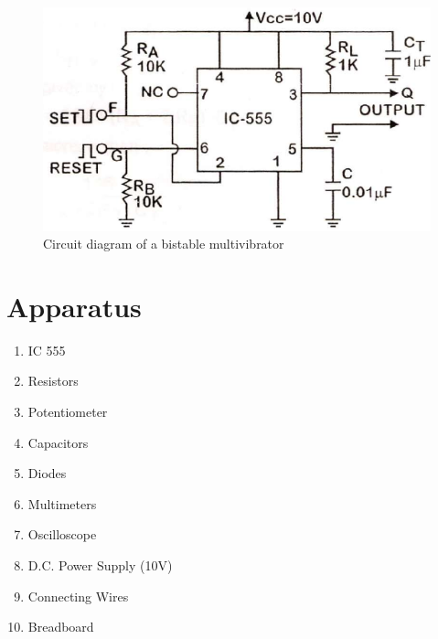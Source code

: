 \begin{figure}[H]
    \centering
    \includegraphics[width=0.8\columnwidth]{images/bis2.png}
    \caption{Circuit diagram of a bistable multivibrator}
    \label{bis2}
\end{figure}

\section{Apparatus}

\begin{enumerate}
    \item IC 555
    \item Resistors
    \item Potentiometer
    \item Capacitors
    \item Diodes
    \item Multimeters
    \item Oscilloscope
    \item D.C. Power Supply (10V)
    \item Connecting Wires
    \item Breadboard
\end{enumerate}